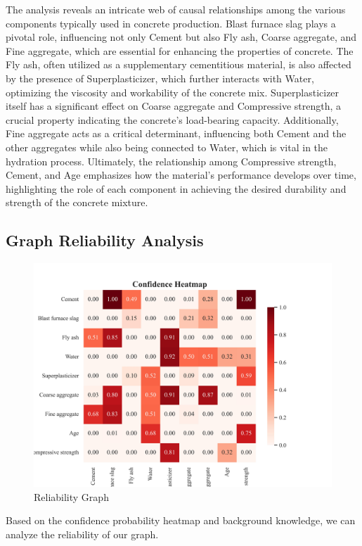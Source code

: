 \documentclass{article}
\begin{document}
The analysis reveals an intricate web of causal relationships among the various components typically used in concrete production. Blast furnace slag plays a pivotal role, influencing not only Cement but also Fly ash, Coarse aggregate, and Fine aggregate, which are essential for enhancing the properties of concrete. The Fly ash, often utilized as a supplementary cementitious material, is also affected by the presence of Superplasticizer, which further interacts with Water, optimizing the viscosity and workability of the concrete mix. Superplasticizer itself has a significant effect on Coarse aggregate and Compressive strength, a crucial property indicating the concrete's load-bearing capacity. Additionally, Fine aggregate acts as a critical determinant, influencing both Cement and the other aggregates while also being connected to Water, which is vital in the hydration process. Ultimately, the relationship among Compressive strength, Cement, and Age emphasizes how the material's performance develops over time, highlighting the role of each component in achieving the desired durability and strength of the concrete mixture.

\subsection{Graph Reliability Analysis}

\begin{figure}[H]
        \centering
        \vspace{-0.5cm}
        \includegraphics[width=0.8\linewidth]{dataset/CCS_Data/output_graph/confidence_heatmap.jpg}
        \caption{Reliability Graph}
        \label{fig:sub3}
\end{figure}

Based on the confidence probability heatmap and background knowledge, we can analyze the reliability of our graph.
\end{document}
